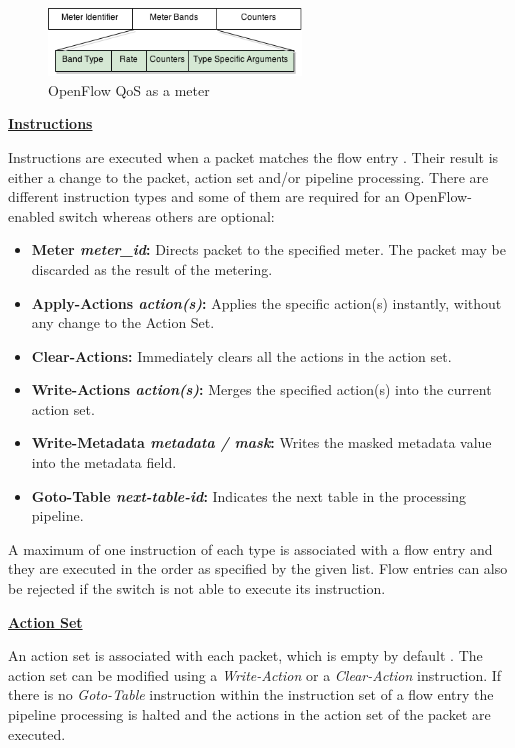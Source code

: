 \begin{figure}[H]
\centering
\includegraphics[width=0.6\textwidth]{images/fundamentals/openflow_qos.png}
\caption{OpenFlow QoS as a meter}
\end{figure}


\underline{\textbf{Instructions}}

Instructions are executed when a packet matches the flow entry \cite{ofspecification}. Their result is either a change to the packet, action set and/or pipeline processing. There are different instruction types and some of them are required for an OpenFlow-enabled switch whereas others are optional:

\begin{itemize}
\item \textbf{Meter \textit{meter\_id}:} Directs packet to the specified meter. The packet may be discarded as the result of the metering.
\item \textbf{Apply-Actions \textit{action(s)}:} Applies the specific action(s) instantly, without any change to the Action Set.
\item \textbf{Clear-Actions:} Immediately clears all the actions in the action set.
\item \textbf{Write-Actions \textit{action(s)}:} Merges the specified action(s) into the current action set.
\item \textbf{Write-Metadata \textit{metadata / mask}:} Writes the masked metadata value into the metadata field.
\item \textbf{Goto-Table \textit{next-table-id}:} Indicates the next table in the processing pipeline.
\end{itemize}

A maximum of one instruction of each type is associated with a flow entry and they are executed in the order as specified by the given list. Flow entries can also be rejected if the switch is not able to execute its instruction.


\underline{\textbf{Action Set}}

An action set is associated with each packet, which is empty by default \cite{ofspecification}. The action set can be modified using a \textit{Write-Action} or a \textit{Clear-Action} instruction. If there is no \textit{Goto-Table} instruction within the instruction set of a flow entry the pipeline processing is halted and the actions in the action set of the packet are executed.


